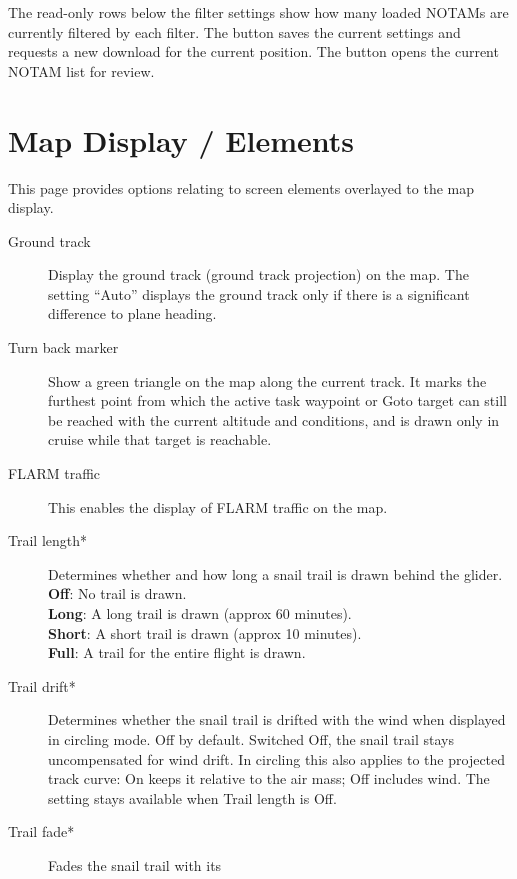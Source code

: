 The read-only rows below the filter settings show how many loaded NOTAMs
are currently filtered by each filter.  The  button saves
the current settings and requests a new download for the current
position.  The  button opens the current NOTAM list for
review.


\section{Map Display / Elements}\label{sec:map-elements}

This page provides options relating to screen elements overlayed to the map display.

\begin{description}
\item[Ground track]  Display the ground track (ground track projection) on the map.
  The setting ``Auto'' displays the ground track only if there is a significant
  difference to plane heading.
\item[Turn back marker]  Show a green triangle on the map along the current
  track. It marks the furthest point from which the active task waypoint or
  Goto target can still be reached with the current altitude and conditions,
  and is drawn only in cruise while that target is reachable.
\item[FLARM traffic]  \label{conf:flarm-on-map} This enables the display of FLARM 
  traffic on the map.
\item[Trail length*] \label{conf:snailtrail} Determines whether and how long a
  snail trail is drawn behind the glider. \\
  {\bf Off}: No trail is drawn. \\
  {\bf Long}: A long trail is drawn (approx 60 minutes). \\
  {\bf Short}: A short trail is drawn (approx 10 minutes). \\
  {\bf Full}: A trail for the entire flight is drawn.
\item[Trail drift*] \label{conf:traildrift} Determines whether the
  snail trail is drifted with the wind when displayed in circling mode.  Off by
  default.  Switched Off, the snail trail stays uncompensated for wind drift.
  In circling this also applies to the projected track curve: On keeps it
  relative to the air mass; Off includes wind.  The setting stays
  available when Trail length is Off.
\item[Trail fade*] \label{conf:trailfade} Fades the snail trail with its

\end{description}
